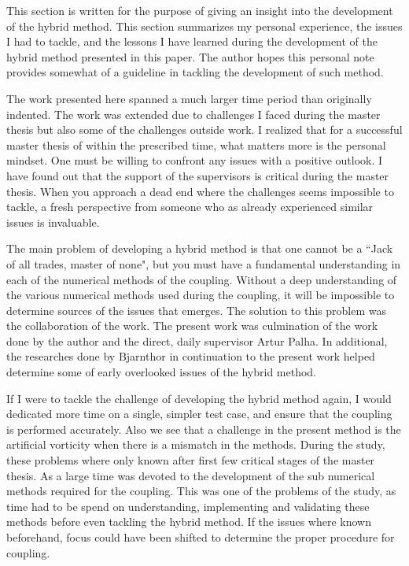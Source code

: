
This section is written for the purpose of giving an insight into the development of the hybrid method. This section summarizes my personal experience, the issues I had to tackle, and the lessons I have learned during the development of the hybrid method presented in this paper. The author hopes this personal note provides somewhat of a guideline in tackling the development of such method.

The work presented here spanned a much larger time period than originally indented. The work was extended due to challenges I faced during the master thesis but also some of the challenges outside work. I realized that for a successful master thesis of within the prescribed time, what matters more is the personal mindset. One must be willing to confront any issues with a positive outlook. I have found out that the support of the supervisors is critical during the master thesis. When you approach a dead end where the challenges seems impossible to tackle, a fresh perspective from someone who as already experienced similar issues is invaluable.

The main problem of developing a hybrid method is that one cannot be a ``Jack of all trades, master of none", but you must have a fundamental understanding in each of the numerical methods of the coupling. Without a deep understanding of the various numerical methods used during the coupling, it will be impossible to determine sources of the issues that emerges. The solution to this problem was the collaboration of the work. The present work was culmination of the work done by the author and the direct, daily supervisor Artur Palha. In additional, the researches done by Bjarnthor in continuation to the present work helped determine some of early overlooked issues of the hybrid method. 

If I were to tackle the challenge of developing the hybrid method again, I would dedicated more time on a single, simpler test case, and ensure that the coupling is performed accurately. Also we see that a challenge in the present method is the artificial vorticity when there is a mismatch in the methods. During the study, these problems where only known after first few critical stages of the master thesis. As a large time was devoted to the development of the sub numerical methods required for the coupling. This was one of the problems of the study, as time had to be spend on understanding, implementing and validating these methods before even tackling the hybrid method. If the issues where known beforehand, focus could have been shifted to determine the proper procedure for coupling.

